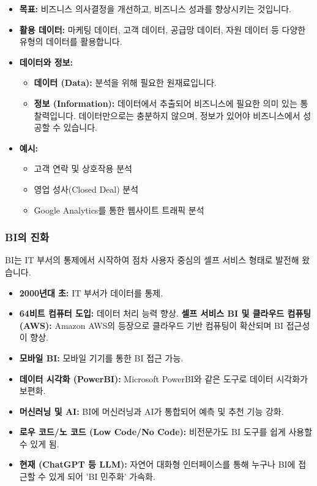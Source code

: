 \documentclass[11pt,a4paper]{article}
\theoremstyle{definition}
\begin{document}
\begin{itemize}
    \item \textbf{목표:} 비즈니스 의사결정을 개선하고, 비즈니스 성과를 향상시키는 것입니다.
    \item \textbf{활용 데이터:} 마케팅 데이터, 고객 데이터, 공급망 데이터, 자원 데이터 등 다양한 유형의 데이터를 활용합니다.
    \item \textbf{데이터와 정보:}
    \begin{itemize}
        \item \textbf{데이터 (Data):} 분석을 위해 필요한 원재료입니다.
        \item \textbf{정보 (Information):} 데이터에서 추출되어 비즈니스에 필요한 의미 있는 통찰력입니다. 데이터만으로는 충분하지 않으며, 정보가 있어야 비즈니스에서 성공할 수 있습니다.
    \end{itemize}
    \item \textbf{예시:}
    \begin{itemize}
        \item 고객 연락 및 상호작용 분석
        \item 영업 성사(Closed Deal) 분석
        \item Google Analytics를 통한 웹사이트 트래픽 분석
    \end{itemize}
\end{itemize}

\subsubsection{BI의 진화}
BI는 IT 부서의 통제에서 시작하여 점차 사용자 중심의 셀프 서비스 형태로 발전해 왔습니다.

\begin{itemize}
    \item \textbf{2000년대 초:} IT 부서가 데이터를 통제.
    \item \textbf{64비트 컴퓨터 도입:} 데이터 처리 능력 향상.
    \textbf{셀프 서비스 BI 및 클라우드 컴퓨팅 (AWS):} Amazon AWS의 등장으로 클라우드 기반 컴퓨팅이 확산되며 BI 접근성이 향상.
    \item \textbf{모바일 BI:} 모바일 기기를 통한 BI 접근 가능.
    \item \textbf{데이터 시각화 (PowerBI):} Microsoft PowerBI와 같은 도구로 데이터 시각화가 보편화.
    \item \textbf{머신러닝 및 AI:} BI에 머신러닝과 AI가 통합되어 예측 및 추천 기능 강화.
    \item \textbf{로우 코드/노 코드 (Low Code/No Code):} 비전문가도 BI 도구를 쉽게 사용할 수 있게 됨.
    \item \textbf{현재 (ChatGPT 등 LLM):} 자연어 대화형 인터페이스를 통해 누구나 BI에 접근할 수 있게 되어 'BI 민주화' 가속화.
\end{itemize}
\end{document}
